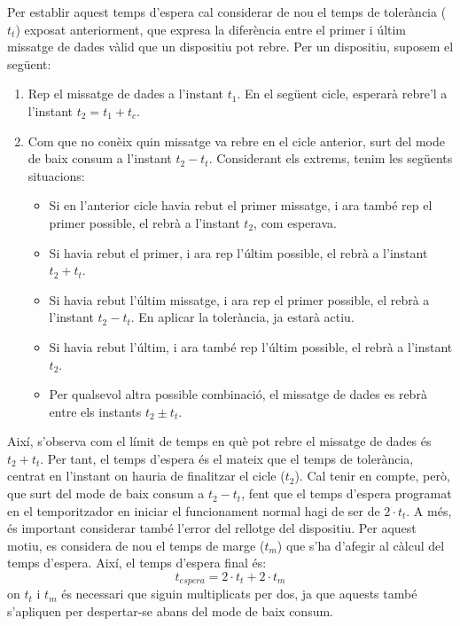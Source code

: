 \documentclass{tfgitic}[2024/07/01]
\begin{document}
{Per establir aquest temps d'espera cal considerar de nou el temps de tolerància ($t_t$) exposat anteriorment, que expresa la diferència entre el primer i últim missatge de dades vàlid que un dispositiu pot rebre. Per un dispositiu, suposem el següent:
\begin{enumerate}
    \item Rep el missatge de dades a l'instant $t_1$. En el següent cicle, esperarà rebre'l a l'instant $t_2 = t_1 + t_c$.
    \item Com que no conèix quin missatge va rebre en el cicle anterior, surt del mode de baix consum a l'instant $t_2 - t_t$. Considerant els extrems, tenim les següents situacions:
    \begin{itemize}
        \item Si en l'anterior cicle havia rebut el primer missatge, i ara també rep el primer possible, el rebrà a l'instant $t_2$, com esperava. 
        \item Si havia rebut el primer, i ara rep l'últim possible, el rebrà a l'instant $t_2 + t_t$.
        \item Si havia rebut l'últim missatge, i ara rep el primer possible, el rebrà a l'instant $t_2 - t_t$. En aplicar la tolerància, ja estarà actiu.
        \item Si havia rebut l'últim, i ara també rep l'últim possible, el rebrà a l'instant $t_2$.
        \item Per qualsevol altra possible combinació, el missatge de dades es rebrà entre els instants $t_2 \pm t_t$.
    \end{itemize}
\end{enumerate} 

Així, s'observa com el límit de temps en què pot rebre el missatge de dades és $t_2 + t_t$. Per tant, el temps d'espera és el mateix que el temps de tolerància, centrat en l'instant on hauria de finalitzar el cicle ($t_2$). Cal tenir en compte, però, que surt del mode de baix consum a $t_2 - t_t$, fent que el temps d'espera programat en el temporitzador en iniciar el funcionament normal hagi de ser de $2 \cdot t_t$. A més, és important considerar també l'error del rellotge del dispositiu. Per aquest motiu, es considera de nou el temps de marge ($t_m$) que s'ha d'afegir al càlcul del temps d'espera. Així, el temps d'espera final és:
\begin{equation}
    t_{espera} = 2 \cdot t_t + 2\cdot t_m
    \label{eq:app_t_espera}
\end{equation}
on $t_t$ i $t_m$ és necessari que siguin multiplicats per dos, ja que aquests també s'apliquen per despertar-se abans del mode de baix consum.

}
\end{document}
